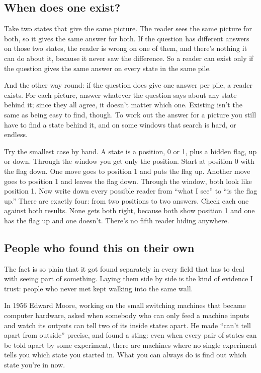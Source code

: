 \documentclass[11pt,twoside]{article}
\theoremstyle{thielethm}
\theoremstyle{thieledef}
\theoremstyle{thieledef}
\theoremstyle{thieledef}
\theoremstyle{thielethm}
\theoremstyle{thieleobs}
\theoremstyle{thielethm}
\begin{document}
\subsection{When does one exist?}

Take two states that give the same picture. The reader sees the same picture for both, so it gives the same answer for both. If the question has different answers on those two states, the reader is wrong on one of them, and there's nothing it can do about it, because it never saw the difference. So a reader can exist only if the question gives the same answer on every state in the same pile.

And the other way round: if the question does give one answer per pile, a reader exists. For each picture, answer whatever the question says about any state behind it; since they all agree, it doesn't matter which one. Existing isn't the same as being easy to find, though. To work out the answer for a picture you still have to find a state behind it, and on some windows that search is hard, or endless.

Try the smallest case by hand. A state is a position, 0 or 1, plus a hidden flag, up or down. Through the window you get only the position. Start at position 0 with the flag down. One move goes to position 1 and puts the flag up. Another move goes to position 1 and leaves the flag down. Through the window, both look like position 1. Now write down every possible reader from ``what I see'' to ``is the flag up.'' There are exactly four: from two positions to two answers. Check each one against both results. None gets both right, because both show position 1 and one has the flag up and one doesn't. There's no fifth reader hiding anywhere.

\subsection{People who found this on their own}

The fact is so plain that it got found separately in every field that has to deal with seeing part of something. Laying them side by side is the kind of evidence I trust: people who never met kept walking into the same wall.

In 1956 Edward Moore, working on the small switching machines that became computer hardware, asked when somebody who can only feed a machine inputs and watch its outputs can tell two of its inside states apart. He made ``can't tell apart from outside'' precise, and found a sting: even when every pair of states can be told apart by some experiment, there are machines where no single experiment tells you which state you started in. What you can always do is find out which state you're in now.
\end{document}
